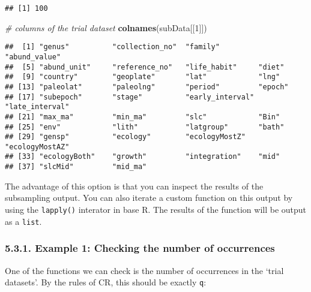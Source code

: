 \documentclass[]{article}
\newenvironment{Shaded}{\begin{snugshade}}{\end{snugshade}}
\newcommand{\CommentTok}[1]{\textcolor[rgb]{0.56,0.35,0.01}{\textit{#1}}}
\newcommand{\ControlFlowTok}[1]{\textcolor[rgb]{0.13,0.29,0.53}{\textbf{#1}}}
\newcommand{\DecValTok}[1]{\textcolor[rgb]{0.00,0.00,0.81}{#1}}
\newcommand{\KeywordTok}[1]{\textcolor[rgb]{0.13,0.29,0.53}{\textbf{#1}}}
\newcommand{\NormalTok}[1]{#1}
\newcommand{\OperatorTok}[1]{\textcolor[rgb]{0.81,0.36,0.00}{\textbf{#1}}}
\newcommand{\StringTok}[1]{\textcolor[rgb]{0.31,0.60,0.02}{#1}}
\begin{document}
\begin{verbatim}
## [1] 100
\end{verbatim}

\begin{Shaded}
\begin{Highlighting}[]
\CommentTok{# columns of the trial dataset}
\KeywordTok{colnames}\NormalTok{(subData[[}\DecValTok{1}\NormalTok{]])}
\end{Highlighting}
\end{Shaded}

\begin{verbatim}
##  [1] "genus"          "collection_no"  "family"         "abund_value"   
##  [5] "abund_unit"     "reference_no"   "life_habit"     "diet"          
##  [9] "country"        "geoplate"       "lat"            "lng"           
## [13] "paleolat"       "paleolng"       "period"         "epoch"         
## [17] "subepoch"       "stage"          "early_interval" "late_interval" 
## [21] "max_ma"         "min_ma"         "slc"            "Bin"           
## [25] "env"            "lith"           "latgroup"       "bath"          
## [29] "gensp"          "ecology"        "ecologyMostZ"   "ecologyMostAZ" 
## [33] "ecologyBoth"    "growth"         "integration"    "mid"           
## [37] "slcMid"         "mid_ma"
\end{verbatim}

The advantage of this option is that you can inspect the results of the
subsampling output. You can also iterate a custom function on this
output by using the \texttt{lapply()} interator in base R. The results
of the function will be output as a \texttt{list}.

\hypertarget{example-1-checking-the-number-of-occurrences}{%
\subsubsection{5.3.1. Example 1: Checking the number of
occurrences}\label{example-1-checking-the-number-of-occurrences}}

One of the functions we can check is the number of occurrences in the
`trial datasets'. By the rules of CR, this should be exactly \texttt{q}:

\begin{Shaded}
\end{Shaded}
\end{document}
